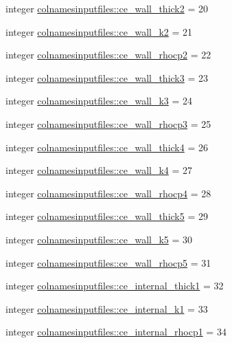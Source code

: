 \begin{DoxyCompactItemize}
\item 
integer \hyperlink{namespacecolnamesinputfiles_a48a640eafb5884a4d027889e5263e54d}{colnamesinputfiles\+::ce\+\_\+wall\+\_\+thick2} = 20
\item 
integer \hyperlink{namespacecolnamesinputfiles_acb05c213823b9b789818112daa485bb3}{colnamesinputfiles\+::ce\+\_\+wall\+\_\+k2} = 21
\item 
integer \hyperlink{namespacecolnamesinputfiles_ab962fb70fd00cc5b904e6a0c6820c15e}{colnamesinputfiles\+::ce\+\_\+wall\+\_\+rhocp2} = 22
\item 
integer \hyperlink{namespacecolnamesinputfiles_af5d49c62769ff9de6925eef9bcf1659a}{colnamesinputfiles\+::ce\+\_\+wall\+\_\+thick3} = 23
\item 
integer \hyperlink{namespacecolnamesinputfiles_a485c8e1bb067002bd9cdcc2ab9a025f5}{colnamesinputfiles\+::ce\+\_\+wall\+\_\+k3} = 24
\item 
integer \hyperlink{namespacecolnamesinputfiles_acecd5e35f648e623c67c755a16c81146}{colnamesinputfiles\+::ce\+\_\+wall\+\_\+rhocp3} = 25
\item 
integer \hyperlink{namespacecolnamesinputfiles_aa12b6be437a155499a81d68a25e63447}{colnamesinputfiles\+::ce\+\_\+wall\+\_\+thick4} = 26
\item 
integer \hyperlink{namespacecolnamesinputfiles_a52cea3d437fe4a2fbec39729693a7fa3}{colnamesinputfiles\+::ce\+\_\+wall\+\_\+k4} = 27
\item 
integer \hyperlink{namespacecolnamesinputfiles_a247ca03139e0f643e0fab6825f9bedc5}{colnamesinputfiles\+::ce\+\_\+wall\+\_\+rhocp4} = 28
\item 
integer \hyperlink{namespacecolnamesinputfiles_ade732387f6c5d5707bcfb29a36e9203f}{colnamesinputfiles\+::ce\+\_\+wall\+\_\+thick5} = 29
\item 
integer \hyperlink{namespacecolnamesinputfiles_aacda4c041fea54bf341a9e4916b71859}{colnamesinputfiles\+::ce\+\_\+wall\+\_\+k5} = 30
\item 
integer \hyperlink{namespacecolnamesinputfiles_ab0c099062633c353168b90905febfdcf}{colnamesinputfiles\+::ce\+\_\+wall\+\_\+rhocp5} = 31
\item 
integer \hyperlink{namespacecolnamesinputfiles_ab457b5625ff240f1f5f71cfda7a1c8c1}{colnamesinputfiles\+::ce\+\_\+internal\+\_\+thick1} = 32
\item 
integer \hyperlink{namespacecolnamesinputfiles_af7d4ccd873926b02dcb3ba262c3e2938}{colnamesinputfiles\+::ce\+\_\+internal\+\_\+k1} = 33
\item 
integer \hyperlink{namespacecolnamesinputfiles_a0a1ae13f900f9f991dd32b852e09ac85}{colnamesinputfiles\+::ce\+\_\+internal\+\_\+rhocp1} = 34

\end{DoxyCompactItemize}

